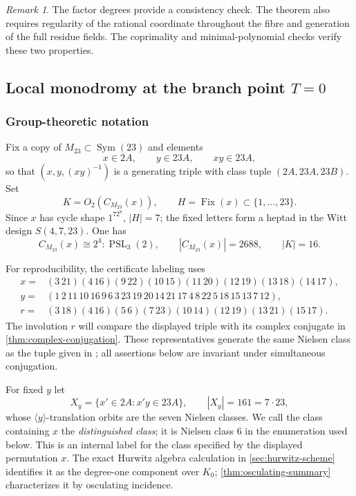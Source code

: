 \documentclass[11pt]{amsart}
\theoremstyle{definition}
\theoremstyle{remark}
\newtheorem{remark}[remark]{Remark}
\newcommand{\PSL}{\operatorname{PSL}}
\newcommand{\Sym}{\operatorname{Sym}}
\newcommand{\Fix}{\operatorname{Fix}}
\newcommand{\Mtt}{M_{23}}
\newcommand{\Cx}{C_{M_{23}}(x)}
\begin{document}
\begin{remark}
The factor degrees provide a consistency check.  The theorem also requires
regularity of the rational coordinate throughout the fibre and generation of
the full residue fields.  The coprimality and minimal-polynomial checks verify
these two properties.
\end{remark}

\subsection{Local monodromy at the branch point
  \texorpdfstring{$T=0$}{T=0}}
\label{sec:setup}

\subsubsection{Group-theoretic notation}

Fix a copy of $\Mtt\subset\Sym(23)$ and elements
\[
 x\in2A,\qquad y\in23A,\qquad xy\in23A,
\]
so that $(x,y,(xy)^{-1})$ is a generating triple with class tuple
$(2A,23A,23B)$.  Set
\[
 K=O_2(\Cx),\qquad
 H=\Fix(x)\subset\{1,\dots,23\}.
\]
Since $x$ has cycle shape $1^72^8$, $|H|=7$; the fixed letters form a
heptad in the Witt design $S(4,7,23)$.  One has
\[
 \Cx\cong2^4{:}\PSL_3(2),\qquad |\Cx|=2688,
 \qquad |K|=16.
\]

For reproducibility, the certificate labeling uses
\[
\begin{aligned}
x={}&(3\,21)(4\,16)(9\,22)(10\,15)(11\,20)(12\,19)(13\,18)(14\,17),\\
y={}&(1\,2\,11\,10\,16\,9\,6\,3\,23\,19\,20\,14\,21\,17\,4\,8\,22\,5\,18\,15\,13\,7\,12),\\
r={}&(3\,18)(4\,16)(5\,6)(7\,23)(10\,14)(12\,19)(13\,21)(15\,17).
\end{aligned}
\]
The involution $r$ will compare the displayed triple with its complex
conjugate in \cref{thm:complex-conjugation}.  These representatives generate the same
Nielsen class as the tuple given in \cite[Section~3]{HJLPPZ}; all assertions below
are invariant under simultaneous conjugation.

For fixed $y$ let
\[
 X_y=\{x'\in2A:x'y\in23A\},\qquad |X_y|=161=7\cdot23,
\]
whose $\langle y\rangle$-translation orbits are the seven Nielsen classes.
We call the class containing $x$ the \emph{distinguished class}; it is
Nielsen class $6$ in the enumeration used below.  This is an internal label
for the class specified by the displayed permutation $x$.  The exact Hurwitz
algebra calculation in \cref{sec:hurwitz-scheme} identifies it as the
degree-one component over $K_0$; \cref{thm:osculating-summary}
characterizes it by osculating incidence.
\end{document}
